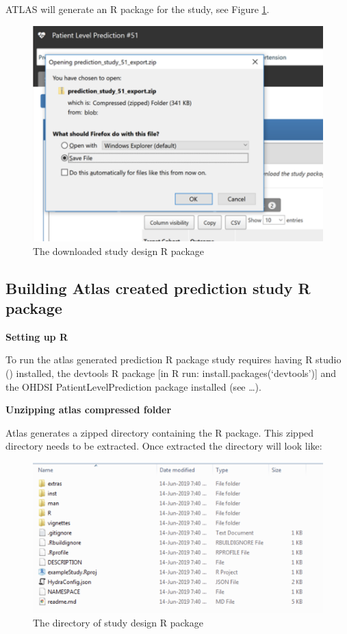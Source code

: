 \documentclass[11pt]{book}
\begin{document}
ATLAS will generate an R package for the study, see Figure
\ref{fig:figureU9}.

\begin{figure}
\includegraphics[width=1\linewidth]{images/PatientLevelPrediction/atlasImplementation/utilities_downloading} \caption{The downloaded study design R package}\label{fig:figureU9}
\end{figure}

\subsection{Building Atlas created prediction study R
package}\label{building-atlas-created-prediction-study-r-package}

\textbf{Setting up R}

To run the atlas generated prediction R package study requires having R
studio () installed, the devtools R package {[}in R run:
install.packages(`devtools'){]} and the OHDSI PatientLevelPrediction
package installed (see \ldots{}).

\textbf{Unzipping atlas compressed folder}

Atlas generates a zipped directory containing the R package. This zipped
directory needs to be extracted. Once extracted the directory will look
like:

\begin{figure}
\includegraphics[width=1\linewidth]{images/PatientLevelPrediction/atlasImplementation/download_folder} \caption{The directory of study design R package}\label{fig:figureU10}
\end{figure}
\end{document}
